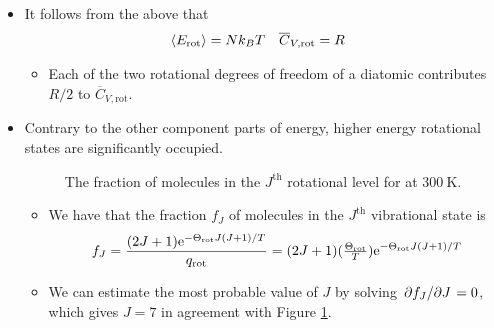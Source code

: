 \documentclass[../notes.tex]{subfiles}
\begin{document}
\begin{itemize}
\begin{itemize}
    \end{itemize}
    \item It follows from the above that
    \begin{align*}
        \prb{E_\text{rot}} &= Nk_BT&
        \overline{C}_{V,\text{rot}} &= R
    \end{align*}
    \begin{itemize}
        \item Each of the two rotational degrees of freedom of a diatomic contributes $R/2$ to $\overline{C}_{V,\text{rot}}$.
    \end{itemize}
    \item Contrary to the other component parts of energy, higher energy rotational states are significantly occupied.
    \begin{figure}[h!]
        \centering
        \caption{The fraction of molecules in the $J^\text{th}$ rotational level for  at $\SI{300}{\kelvin}$.}
        \label{fig:rotationalPopulations}
    \end{figure}
    \begin{itemize}
        \item We have that the fraction $f_J$ of molecules in the $J^\text{th}$ vibrational state is
        \begin{equation*}
            f_J = \frac{(2J+1)\e[-\Theta_\text{rot}J(J+1)/T]}{q_\text{rot}} = (2J+1)(\tfrac{\Theta_\text{rot}}{T})\e[-\Theta_\text{rot}J(J+1)/T]
        \end{equation*}
        \item We can estimate the most probable value of $J$ by solving $\pdv*{f_J}{J}=0$, which gives $J=7$ in agreement with Figure \ref{fig:rotationalPopulations}.
    \end{itemize}
\end{itemize}
\end{document}

